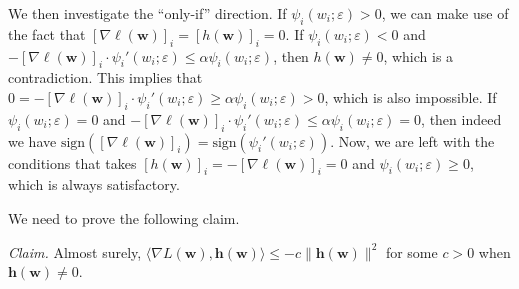 \documentclass[10pt,a4paper]{article}
\begin{document}
We then investigate the ``only-if'' direction. If $\psi_i(w_i;\varepsilon)>0$, we can make use of the fact that $[\nabla\ell(\mathbf{w})]_i=[h(\mathbf{w})]_i=0$. If $\psi_i(w_i;\varepsilon)< 0$ and $-[\nabla\ell(\mathbf{w})]_i\cdot \psi_i'(w_i;\varepsilon)\leq  \alpha \psi_i(w_i;\varepsilon)$, then $h(\mathbf{w})\neq 0$, which is a contradiction. This implies that $0=-[\nabla\ell(\mathbf{w})]_i\cdot \psi_i'(w_i;\varepsilon)\geq  \alpha \psi_i(w_i;\varepsilon)>0$, which is also impossible. If $\psi_i(w_i;\varepsilon)= 0$ and $-[\nabla\ell(\mathbf{w})]_i\cdot \psi_i'(w_i;\varepsilon)\leq  \alpha \psi_i(w_i;\varepsilon)=0$, then indeed we have $\text{sign}([\nabla\ell(\mathbf{w})]_i)=\text{sign}(\psi_i'(w_i;\varepsilon))$. Now, we are left with the conditions that takes $[h(\mathbf{w})]_i=-[\nabla\ell(\mathbf{w})]_i=0$ and $\psi_i(w_i;\varepsilon)\geq 0$, which is always satisfactory.

We need to prove the following claim.

\textit{Claim.} Almost surely, $\langle \nabla L(\mathbf{w}), \mathbf{h}(\mathbf{w})\rangle \leq -c\lVert \mathbf{h}(\mathbf{w})\rVert ^2$ for some $c>0$ when $\mathbf{h}(\mathbf{w})\neq 0$.
\end{document}
